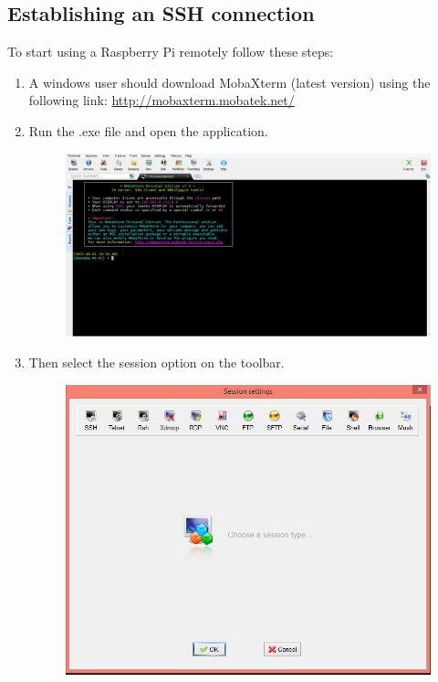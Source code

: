 \documentclass[11pt,a4paper]{report}
\begin{document}
\begin{flushleft}
	
	\newpage	
	\section{Establishing an SSH connection}
	
	To start using a Raspberry Pi remotely follow these steps:
	\begin{enumerate}
		\item A windows user should download MobaXterm (latest version) using the following link: \url{http://mobaxterm.mobatek.net/}
		\item Run the .exe file and open the application.
		\begin{figure}[h!]
			\includegraphics[scale=0.3]{M1.PNG}
			\centering
			\caption{}
		\end{figure}
		\item Then select the session option on the toolbar.
		\begin{figure}[h!]
			\includegraphics[scale=0.5]{M2.PNG}

\end{figure}
\end{enumerate}
\end{flushleft}
\end{document}
